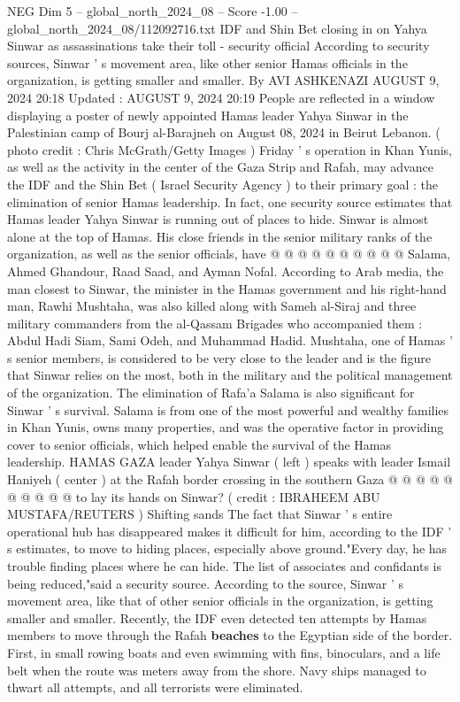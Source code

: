 \begin{textsample}{NEG Dim 5 – global\_north\_2024\_08 – Score -1.00 – global\_north\_2024\_08/112092716.txt}  \label{ex:f5_neg_068}
IDF and Shin Bet closing in on Yahya Sinwar as assassinations take their toll - security official According to security sources, Sinwar ' s movement area, like other senior Hamas officials in the organization, is getting smaller and smaller.
By AVI ASHKENAZI AUGUST 9, 2024 20:18 Updated : AUGUST 9, 2024 20:19 People are reflected in a window displaying a poster of newly appointed Hamas leader Yahya Sinwar in the Palestinian camp of Bourj al-Barajneh on August 08, 2024 in Beirut Lebanon. ( photo credit : Chris McGrath/Getty Images ) Friday ' s operation in Khan Yunis, as well as the activity in the center of the Gaza Strip and Rafah, may advance the IDF and the Shin Bet ( Israel Security Agency ) to their primary goal : the elimination of senior Hamas leadership.
In fact, one security source estimates that Hamas leader Yahya Sinwar is running out of places to hide.
Sinwar is almost alone at the top of Hamas.
His close friends in the senior military ranks of the organization, as well as the senior officials, have @ @ @ @ @ @ @ @ @ @ Salama, Ahmed Ghandour, Raad Saad, and Ayman Nofal.
According to Arab media, the man closest to Sinwar, the minister in the Hamas government and his right-hand man, Rawhi Mushtaha, was also killed along with Sameh al-Siraj and three military commanders from the al-Qassam Brigades who accompanied them : Abdul Hadi Siam, Sami Odeh, and Muhammad Hadid.
Mushtaha, one of Hamas ' s senior members, is considered to be very close to the leader and is the figure that Sinwar relies on the most, both in the military and the political management of the organization.
The elimination of Rafa'a Salama is also significant for Sinwar ' s survival.
Salama is from one of the most powerful and wealthy families in Khan Yunis, owns many properties, and was the operative factor in providing cover to senior officials, which helped enable the survival of the Hamas leadership.
HAMAS GAZA leader Yahya Sinwar ( left ) speaks with leader Ismail Haniyeh ( center ) at the Rafah border crossing in the southern Gaza @ @ @ @ @ @ @ @ @ @ to lay its hands on Sinwar? ( credit : IBRAHEEM ABU MUSTAFA/REUTERS ) Shifting sands The fact that Sinwar ' s entire operational hub has disappeared makes it difficult for him, according to the IDF ' s estimates, to move to hiding places, especially above ground."Every day, he has trouble finding places where he can hide.
The list of associates and confidants is being reduced,"said a security source.
According to the source, Sinwar ' s movement area, like that of other senior officials in the organization, is getting smaller and smaller.
Recently, the IDF even detected ten attempts by Hamas members to move through the Rafah \textbf{beaches} to the Egyptian side of the border.
First, in small rowing boats and even swimming with fins, binoculars, and a life belt when the route was meters away from the shore.
Navy ships managed to thwart all attempts, and all terrorists were eliminated.

\end{textsample}
